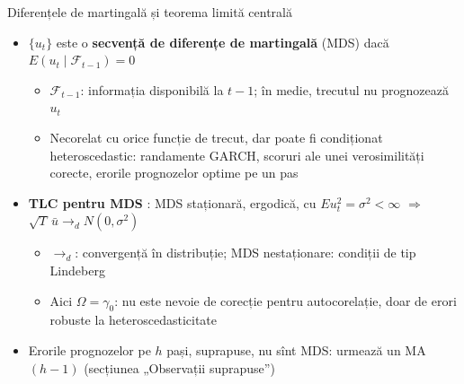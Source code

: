 \begin{frame}{Diferențele de martingală și teorema limită centrală}
\itemsize{\small}
\begin{itemize}
    \item $\{u_t\}$ este o \textbf{secvență de diferențe de martingală} (MDS) dacă $E(u_t \mid \mathcal{F}_{t-1}) = 0$
    \begin{itemize}
        \item $\mathcal{F}_{t-1}$: informația disponibilă la $t-1$; în medie, trecutul nu prognozează $u_t$
        \item Necorelat cu orice funcție de trecut, dar poate fi condiționat heteroscedastic: randamente GARCH, scoruri ale unei verosimilități corecte, erorile prognozelor optime pe un pas
    \end{itemize}
    \item \textbf{TLC pentru MDS} : MDS staționară, ergodică, cu $E u_t^2 = \sigma^2 < \infty$ $\Rightarrow$ $\sqrt{T}\,\bar u \to_d N(0, \sigma^2)$
    \begin{itemize}
        \item $\to_d$: convergență în distribuție; MDS nestaționare: condiții de tip Lindeberg 
        \item Aici $\Omega = \gamma_0$: nu este nevoie de corecție pentru autocorelație, doar de erori robuste la heteroscedasticitate 
    \end{itemize}
    \item Erorile prognozelor pe $h$ pași, suprapuse, nu sînt MDS: urmează un MA$(h-1)$ (secțiunea „Observații suprapuse”)
\end{itemize}
\end{frame}

